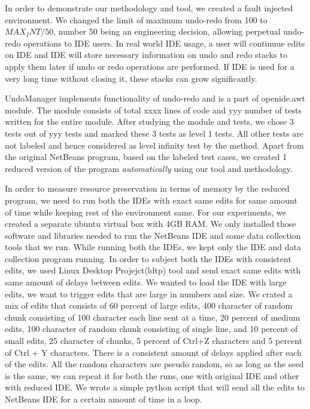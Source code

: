 In order to demonstrate our methodology and tool, we created a fault injected environment. We changed the limit of maximum undo-redo from 100 to $MAX_INT / 50$, number 50 being an engineering decision, allowing perpetual undo-redo operations to IDE users.  In real world IDE usage, a user will continuue edits on IDE  and IDE will store necessary information on undo and redo stacks to apply them later if undo or redo operations are performed. If IDE is used for a very long time without closing it, these stacks can grow significantly. 

UndoManager implements functionality of undo-redo and is a part of openide.awt module. The module consists of total xxxx lines of code and yyy number of tests written for the entire module. After studying the module and tests, we chose 3 tests out of yyy tests and marked these 3 tests as level 1 tests. All other tests are not labeled and hence considered as level infinity test by the method. Apart from the original NetBeans program, based on the labeled test cases, we created 1 reduced version of the program \emph{automatically} using our tool and methodology. 

In order to measure resource preservation in terms of memory by the reduced program, we need to run both the IDEs with exact same edits for same amount of time while keeping rest of the environment same. For our experiments, we created a separate ubuntu virtual box with 4GB RAM. We only installed those software and libraries needed to run the NetBeans IDE and some data collection tools that we run. While running both the IDEs, we kept only the IDE and data collection program running. In order to subject both the IDEs with consistent edits, we used Linux Desktop Projejct(ldtp) tool and send exact same edits with same amount of delays between edits. We wanted to load the IDE with large edits, we want to trigger edits that are large in numbers and size. We crated a mix of edits that consists of 60 percent of large edits, 400 character of random chunk consisting of 100 character each line sent at a time, 20 percent of medium edits, 100 character of random chunk consisting of single line, and 10 percent of small edits, 25 character of chunks, 5 percent of Ctrl+Z characters and 5 percent of Ctrl + Y characters. There is a consistent amount of delays applied after each of the edits. All the random characters are pseudo random, so as long as the seed is the same, we can repeat it for both the runs, one with original IDE and other with reduced IDE. We wrote a simple python script that will send all the edits to NetBeans IDE for a certain amount of time in a loop. 

